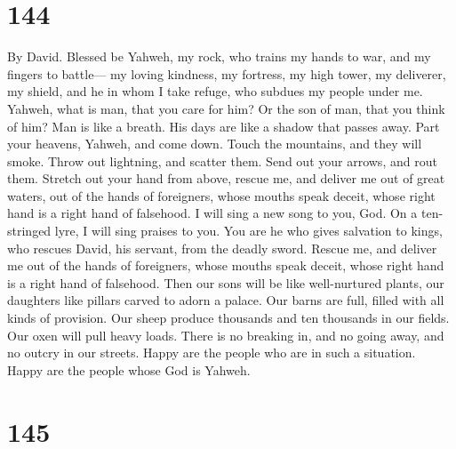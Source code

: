 \hypertarget{section-136}{%
\section{144}\label{section-136}}

By David.  Blessed be Yahweh, my rock, who trains my hands
to war, and my fingers to battle---  my loving kindness,
my fortress, my high tower, my deliverer, my shield, and he in whom I
take refuge, who subdues my people under me.  Yahweh, what
is man, that you care for him? Or the son of man, that you think of him?
 Man is like a breath. His days are like a shadow that
passes away.  Part your heavens, Yahweh, and come down.
Touch the mountains, and they will smoke.  Throw out
lightning, and scatter them. Send out your arrows, and rout them.
 Stretch out your hand from above, rescue me, and deliver
me out of great waters, out of the hands of foreigners, 
whose mouths speak deceit, whose right hand is a right hand of
falsehood.  I will sing a new song to you, God. On a
ten-stringed lyre, I will sing praises to you.  You are
he who gives salvation to kings, who rescues David, his servant, from
the deadly sword.  Rescue me, and deliver me out of the
hands of foreigners, whose mouths speak deceit, whose right hand is a
right hand of falsehood.  Then our sons will be like
well-nurtured plants, our daughters like pillars carved to adorn a
palace.  Our barns are full, filled with all kinds of
provision. Our sheep produce thousands and ten thousands in our fields.
 Our oxen will pull heavy loads. There is no breaking in,
and no going away, and no outcry in our streets.  Happy
are the people who are in such a situation. Happy are the people whose
God is Yahweh.

\hypertarget{section-137}{%
\section{145}\label{section-137}}

